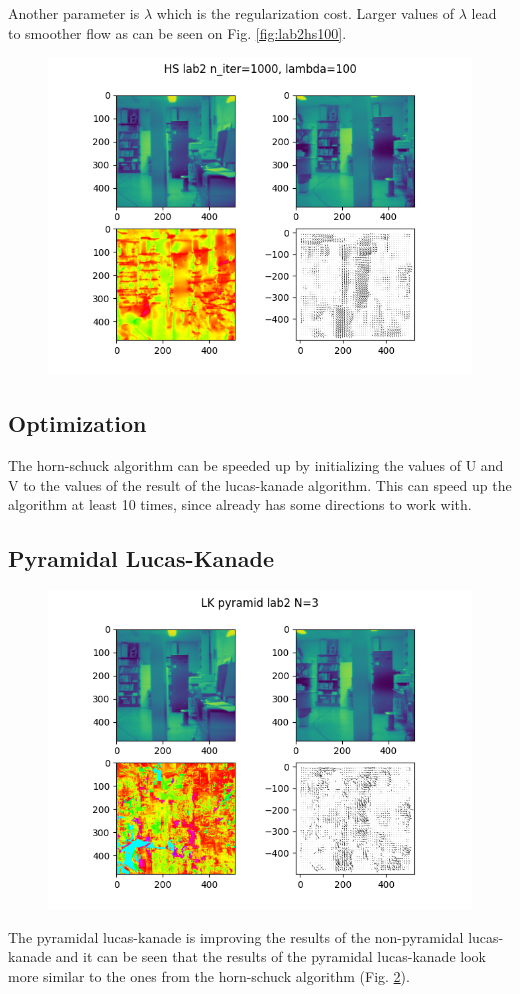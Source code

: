 \documentclass[9pt]{IEEEtran}
\begin{document}
Another parameter is $\lambda$ which is the regularization cost. Larger values of $\lambda$ lead to smoother flow as can be seen on Fig. \ref{fig:lab2hs100}.
\begin{figure}[h]
    \centering
    \includegraphics[width=1\columnwidth, scale=0.2]{lab2hs100.png}
    \label{fig:lab2js100}
\end{figure}
\subsection{Optimization}
The horn-schuck algorithm can be speeded up by initializing the values of U and V to the values of the result of the lucas-kanade algorithm. This can speed up the algorithm at least 10 times, since already has some directions to work with.

\subsection{Pyramidal Lucas-Kanade}
\begin{figure}[h]
    \centering
    \includegraphics[width=1\columnwidth, scale=0.2]{lab2lkp.png}
    \label{fig:lab2lkp}
\end{figure}
The pyramidal lucas-kanade is improving the results of the non-pyramidal lucas-kanade and it can be seen that the results of the pyramidal lucas-kanade look more similar to the ones from the horn-schuck algorithm (Fig. \ref{fig:lab2lkp}).
\end{document}
